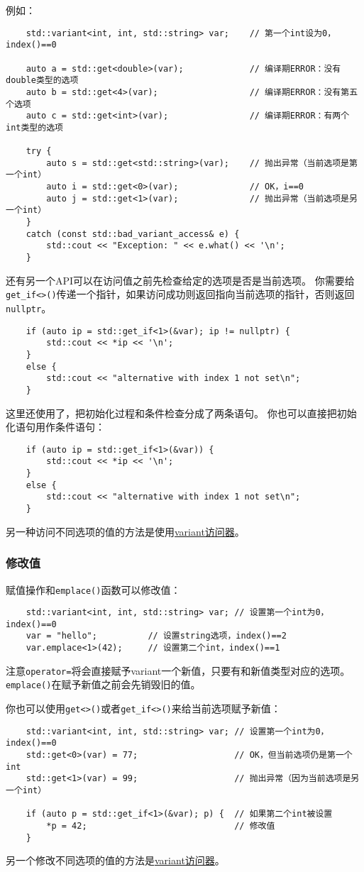 例如：
\begin{lstlisting}
    std::variant<int, int, std::string> var;    // 第一个int设为0，index()==0

    auto a = std::get<double>(var);             // 编译期ERROR：没有double类型的选项
    auto b = std::get<4>(var);                  // 编译期ERROR：没有第五个选项
    auto c = std::get<int>(var);                // 编译期ERROR：有两个int类型的选项

    try {
        auto s = std::get<std::string>(var);    // 抛出异常（当前选项是第一个int）
        auto i = std::get<0>(var);              // OK，i==0
        auto j = std::get<1>(var);              // 抛出异常（当前选项是另一个int）
    }
    catch (const std::bad_variant_access& e) {
        std::cout << "Exception: " << e.what() << '\n';
    }
\end{lstlisting}
还有另一个API可以在访问值之前先检查给定的选项是否是当前选项。
你需要给\texttt{get\_if<>()}传递一个指针，如果访问成功则返回指向当前选项的指针，否则返回\texttt{nullptr}。
\begin{lstlisting}
    if (auto ip = std::get_if<1>(&var); ip != nullptr) {
        std::cout << *ip << '\n';
    }
    else {
        std::cout << "alternative with index 1 not set\n";
    }
\end{lstlisting}
这里还使用了，把初始化过程和条件检查分成了两条语句。
你也可以直接把初始化语句用作条件语句：
\begin{lstlisting}
    if (auto ip = std::get_if<1>(&var)) {
        std::cout << *ip << '\n';
    }
    else {
        std::cout << "alternative with index 1 not set\n";
    }
\end{lstlisting}
另一种访问不同选项的值的方法是使用\hyperref[ch16.3.3]{variant访问器}。

\subsubsection{修改值}
赋值操作和\texttt{emplace()}函数可以修改值：
\begin{lstlisting}
    std::variant<int, int, std::string> var; // 设置第一个int为0，index()==0
    var = "hello";          // 设置string选项，index()==2
    var.emplace<1>(42);     // 设置第二个int，index()==1
\end{lstlisting}
注意\texttt{operator=}将会直接赋予variant一个新值，只要有和新值类型对应的选项。
\texttt{emplace()}在赋予新值之前会先销毁旧的值。

你也可以使用\texttt{get<>()}或者\texttt{get\_if<>()}来给当前选项赋予新值：
\begin{lstlisting}
    std::variant<int, int, std::string> var; // 设置第一个int为0，index()==0
    std::get<0>(var) = 77;                   // OK，但当前选项仍是第一个int
    std::get<1>(var) = 99;                   // 抛出异常（因为当前选项是另一个int）

    if (auto p = std::get_if<1>(&var); p) {  // 如果第二个int被设置
        *p = 42;                             // 修改值
    }
\end{lstlisting}
另一个修改不同选项的值的方法是\hyperref[ch16.3.3]{variant访问器}。

